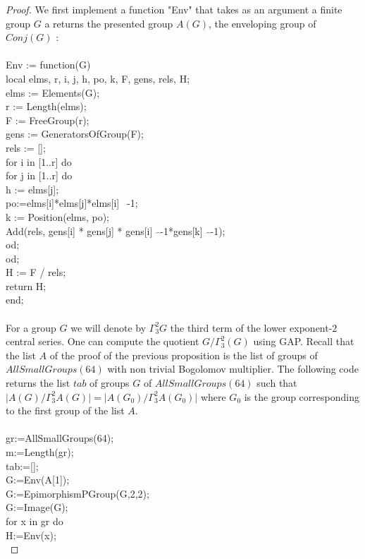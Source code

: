 \documentclass[12pt, reqno]{amsart}
\begin{document}
\begin{proof}
We first implement a function "Env" that takes as an argument a finite group $G$ a returns the presented group $A(G)$, the enveloping group of $Conj(G)$ :\\\\
Env := function(G)\\
local elms, r, i, j, h, po, k, F, gens, rels, H; \\
elms := Elements(G);\\
r := Length(elms);\\
F := FreeGroup(r); \\
gens := GeneratorsOfGroup(F);\\
rels := [\:];\\
for i in [1..r] do\\
for j in [1..r] do\\
        h := elms[j];\\
        po:=elms[i]*elms[j]*elms[i] $\widehat{\:\:}$-1;\\
        k := Position(elms, po);\\
        Add(rels, gens[i] * gens[j] * gens[i] $\widehat{\:\:}$-1*gens[k] $\widehat{\:\:}$-1);\\
od;\\
od;\\
H := F / rels;\\
return H;\\
end;\\\\
For a group $G$ we will denote by $\Gamma_3^2G$ the third term of the lower exponent-$2$ central series. One can compute the quotient $G/\Gamma_3^2(G)$ using GAP. Recall that the list $A$ of the proof of the previous proposition is the list of groups of $AllSmallGroups(64)$ with non trivial Bogolomov multiplier. The following code returns the list $tab$ of groups $G$ of $AllSmallGroups(64)$ such that $\vert A(G)/\Gamma_3^2A(G)\vert=\vert A(G_0)/\Gamma_3^2A(G_0)\vert$ where $G_0$ is the group corresponding to the first group of the list $A$.\\\\
gr:=AllSmallGroups(64);\\
m:=Length(gr);\\
tab:=[\:];\\
G:=Env(A[1]);\\
G:=EpimorphismPGroup(G,2,2);\\
G:=Image(G);\\
for x in gr do\\
H:=Env(x);\\

\end{proof}
\end{document}
